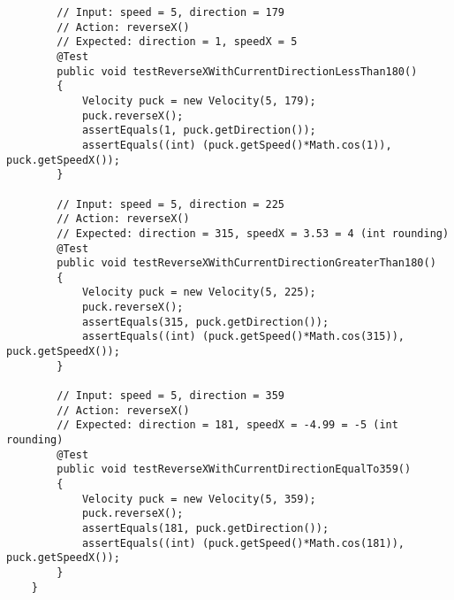 \documentclass{article}
\begin{document}
\begin{lstlisting}
        // Input: speed = 5, direction = 179
        // Action: reverseX()
        // Expected: direction = 1, speedX = 5
        @Test
        public void testReverseXWithCurrentDirectionLessThan180()
        {
            Velocity puck = new Velocity(5, 179);
            puck.reverseX();
            assertEquals(1, puck.getDirection());
            assertEquals((int) (puck.getSpeed()*Math.cos(1)), puck.getSpeedX());
        }

        // Input: speed = 5, direction = 225
        // Action: reverseX()
        // Expected: direction = 315, speedX = 3.53 = 4 (int rounding)
        @Test
        public void testReverseXWithCurrentDirectionGreaterThan180()
        {
            Velocity puck = new Velocity(5, 225);
            puck.reverseX();
            assertEquals(315, puck.getDirection());
            assertEquals((int) (puck.getSpeed()*Math.cos(315)), puck.getSpeedX());
        }

        // Input: speed = 5, direction = 359
        // Action: reverseX()
        // Expected: direction = 181, speedX = -4.99 = -5 (int rounding) 
        @Test
        public void testReverseXWithCurrentDirectionEqualTo359()
        {
            Velocity puck = new Velocity(5, 359);
            puck.reverseX();
            assertEquals(181, puck.getDirection());
            assertEquals((int) (puck.getSpeed()*Math.cos(181)), puck.getSpeedX());
        }
    }
\end{lstlisting}
\end{document}

